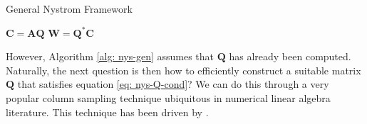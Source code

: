 {\centering
\begin{minipage}{.85\linewidth}
    \begin{algorithm}[H]
        \caption{General Nystrom Framework}
        \label{alg: nys-gen}
        \SetAlgoLined
        \DontPrintSemicolon

        \BlankLine
        $\bm{C} = \bm{A} \bm{Q}$\;
        $\bm{W} = \bm{Q}^{\ast} \bm{C}$\;
        \BlankLine
    \end{algorithm}
\end{minipage}
\par}

However, Algorithm \ref{alg: nys-gen} assumes that $\bm{Q}$ has already been computed. Naturally, the next question is then how to efficiently construct a suitable matrix $\bm{Q}$ that satisfies equation \ref{eq: nys-Q-cond}? We can do this through a very popular column sampling technique ubiquitous in numerical linear algebra literature. This technique has been driven by .


